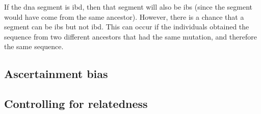 If the \acrshort{dna} segment is \gls{ibd}, then that segment will also be \gls{ibs} (since the segment would have come from the same ancestor).
However, there is  a chance that a segment can be \gls{ibs} but not \gls{ibd}.
This can occur if the individuals obtained the sequence from two different ancestors that had the same mutation, and therefore the same sequence.

\subsection{Ascertainment bias}
\label{sub:ascertainment_bias}


















\subsection{Controlling for relatedness}
\label{sub:controlling_for_relatedness}




















